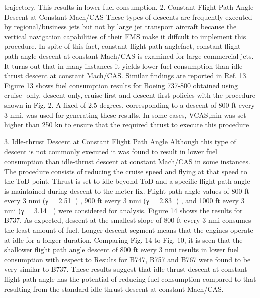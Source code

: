 \documentclass{aer1315-pretty}
\begin{document}
\begin{itemize}
trajectory. This results in lower
fuel consumption.
2. Constant Flight Path Angle Descent at Constant Mach/CAS
     These types of descents are frequently executed by regional/business jets but not by large jet transport aircraft
because the vertical navigation capabilities of their FMS make it diffcult to implement this procedure. In spite of this
fact, constant flight path anglefact, constant flight path angle
descent at constant Mach/CAS is
examined for large commercial
jets. It turns out that in many
instances it yields lower fuel
consumption than idle-thrust
descent at constant Mach/CAS.
Similar findings are reported in
Ref. 13.
    Figure     13    shows      fuel
consumption results for Boeing
737-800 obtained using cruise-
only, descent-only, cruise-first
and descent-first policies with the
procedure shown in Fig. 2. A
fixed          of 2.5 degrees,
corresponding to a descent of 800
ft every 3 nmi, was used for
generating these results. In some
cases, VCAS,min was set higher than
250 kn to ensure that the required
thrust to execute this procedure

3. Idle-thrust Descent at Constant Flight Path Angle
    Although this type of descent is not commonly executed it was found to result in lower fuel consumption than
idle-thrust descent at constant Mach/CAS in some instances. The procedure consists of reducing the cruise speed
and flying at that speed to the ToD point. Thrust is set to idle beyond ToD and a specific flight path angle is
maintained during descent to the meter fix. Flight path angle values of 800 ft every 3 nmi (γ = 2.51 ) , 900 ft every 3
nmi (γ = 2.83 ) , and 1000 ft every 3 nmi (γ = 3.14  ) were considered for analysis. Figure 14 shows the results for
B737.
    As expected, descent at the smallest slope of 800 ft every 3 nmi consumes the least amount of fuel. Longer
descent segment means that the engines operate at idle for a longer duration. Comparing Fig. 14 to Fig. 10, it is seen
that the shallower flight path angle descent of 800 ft every 3 nmi results in lower fuel consumption with respect to
    Results for B747, B757 and B767 were found to be very similar to B737. These results suggest that idle-thrust
descent at constant flight path angle has the potential of reducing fuel consumption compared to that resulting from
the standard idle-thrust descent at constant Mach/CAS.



\end{itemize}
\end{document}
